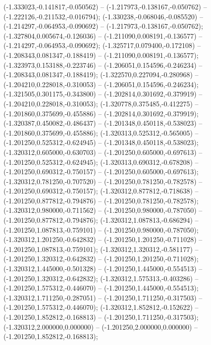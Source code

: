  (-1.333023,-0.141817,-0.050562) -- (-1.217973,-0.138167,-0.050762) -- (-1.222126,-0.211532,-0.016794);
 (-1.330238,-0.068046,-0.085520) -- (-1.214297,-0.064953,-0.090692) -- (-1.217973,-0.138167,-0.050762);
 (-1.327804,0.005674,-0.126036) -- (-1.211090,0.008191,-0.136577) -- (-1.214297,-0.064953,-0.090692);
 (-1.325717,0.079400,-0.172108) -- (-1.208343,0.081347,-0.188419) -- (-1.211090,0.008191,-0.136577);
 (-1.323973,0.153188,-0.223746) -- (-1.206051,0.154596,-0.246234) -- (-1.208343,0.081347,-0.188419);
 (-1.322570,0.227094,-0.280968) -- (-1.204210,0.228018,-0.310053) -- (-1.206051,0.154596,-0.246234);
 (-1.321505,0.301175,-0.343800) -- (-1.202814,0.301692,-0.379919) -- (-1.204210,0.228018,-0.310053);
 (-1.320778,0.375485,-0.412275) -- (-1.201860,0.375699,-0.455886) -- (-1.202814,0.301692,-0.379919);
 (-1.320387,0.450082,-0.486437) -- (-1.201348,0.450118,-0.538023) -- (-1.201860,0.375699,-0.455886);
 (-1.320313,0.525312,-0.565005) -- (-1.201250,0.525312,-0.624945) -- (-1.201348,0.450118,-0.538023);
 (-1.320312,0.605000,-0.630703) -- (-1.201250,0.605000,-0.697613) -- (-1.201250,0.525312,-0.624945);
 (-1.320313,0.690312,-0.678208) -- (-1.201250,0.690312,-0.750157) -- (-1.201250,0.605000,-0.697613);
 (-1.320312,0.781250,-0.707520) -- (-1.201250,0.781250,-0.782578) -- (-1.201250,0.690312,-0.750157);
 (-1.320312,0.877812,-0.718638) -- (-1.201250,0.877812,-0.794876) -- (-1.201250,0.781250,-0.782578);
 (-1.320312,0.980000,-0.711562) -- (-1.201250,0.980000,-0.787050) -- (-1.201250,0.877812,-0.794876);
 (-1.320312,1.087813,-0.686294) -- (-1.201250,1.087813,-0.759101) -- (-1.201250,0.980000,-0.787050);
 (-1.320312,1.201250,-0.642832) -- (-1.201250,1.201250,-0.711028) -- (-1.201250,1.087813,-0.759101);
 (-1.320312,1.320312,-0.581177) -- (-1.201250,1.320312,-0.642832) -- (-1.201250,1.201250,-0.711028);
 (-1.320312,1.445000,-0.501328) -- (-1.201250,1.445000,-0.554513) -- (-1.201250,1.320312,-0.642832);
 (-1.320312,1.575313,-0.403286) -- (-1.201250,1.575312,-0.446070) -- (-1.201250,1.445000,-0.554513);
 (-1.320312,1.711250,-0.287051) -- (-1.201250,1.711250,-0.317503) -- (-1.201250,1.575312,-0.446070);
 (-1.320312,1.852812,-0.152622) -- (-1.201250,1.852812,-0.168813) -- (-1.201250,1.711250,-0.317503);
 (-1.320312,2.000000,0.000000) -- (-1.201250,2.000000,0.000000) -- (-1.201250,1.852812,-0.168813);
